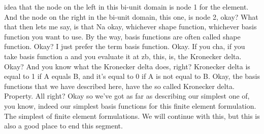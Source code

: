 \documentclass[10pt]{article}
\begin{document}
idea that the node on the left in this bi-unit domain is node 1 for the element. And the node on the right in the bi-unit domain, this one, is node 2, okay? What that then lets me say, is that Na okay, whichever shape function, whichever basis function you want to use. By the way, basis functions are often called shape function. Okay? I just prefer the term basis function. Okay. If you cha, if you take basis function a and you evaluate it at zb, this, is, the Kronecker delta. Okay? And you know what the Kronecker delta does, right? Kronecker delta is equal to 1 if A equals B, and it's equal to 0 if A is not equal to B. Okay, the basis functions that we have described here, have the so called Kronecker delta. Property. All right? Okay so we've got as far as describing our simplest one of, you know, indeed our simplest basis functions for this finite element formulation. The simplest of finite element formulations. We will continue with this, but this is also a good place to end this segment.
\end{document}
